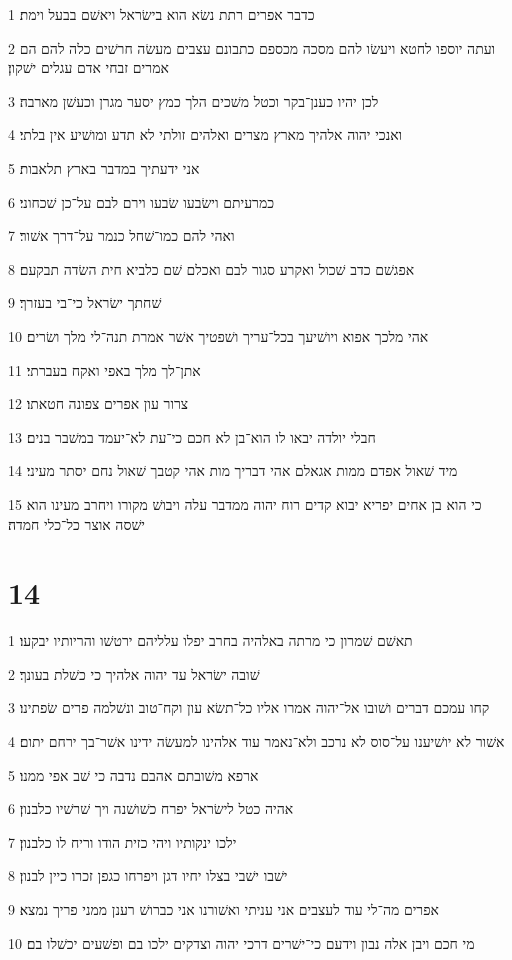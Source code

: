 \par 1 כדבר אפרים רתת נשׂא הוא בישׂראל ויאשׁם בבעל וימת׃
\par 2 ועתה יוספו לחטא ויעשׂו להם מסכה מכספם כתבונם עצבים מעשׂה חרשׁים כלה להם הם אמרים זבחי אדם עגלים ישׁקון׃
\par 3 לכן יהיו כענן־בקר וכטל משׁכים הלך כמץ יסער מגרן וכעשׁן מארבה׃
\par 4 ואנכי יהוה אלהיך מארץ מצרים ואלהים זולתי לא תדע ומושׁיע אין בלתי׃
\par 5 אני ידעתיך במדבר בארץ תלאבות׃
\par 6 כמרעיתם וישׂבעו שׂבעו וירם לבם על־כן שׁכחוני׃
\par 7 ואהי להם כמו־שׁחל כנמר על־דרך אשׁור׃
\par 8 אפגשׁם כדב שׁכול ואקרע סגור לבם ואכלם שׁם כלביא חית השׂדה תבקעם׃
\par 9 שׁחתך ישׂראל כי־בי בעזרך׃
\par 10 אהי מלכך אפוא ויושׁיעך בכל־עריך ושׁפטיך אשׁר אמרת תנה־לי מלך ושׂרים׃
\par 11 אתן־לך מלך באפי ואקח בעברתי׃
\par 12 צרור עון אפרים צפונה חטאתו׃
\par 13 חבלי יולדה יבאו לו הוא־בן לא חכם כי־עת לא־יעמד במשׁבר בנים׃
\par 14 מיד שׁאול אפדם ממות אגאלם אהי דבריך מות אהי קטבך שׁאול נחם יסתר מעיני׃
\par 15 כי הוא בן אחים יפריא יבוא קדים רוח יהוה ממדבר עלה ויבושׁ מקורו ויחרב מעינו הוא ישׁסה אוצר כל־כלי חמדה׃

\chapter{14}

\par 1 תאשׁם שׁמרון כי מרתה באלהיה בחרב יפלו עלליהם ירטשׁו והריותיו יבקעו׃
\par 2 שׁובה ישׂראל עד יהוה אלהיך כי כשׁלת בעונך׃
\par 3 קחו עמכם דברים ושׁובו אל־יהוה אמרו אליו כל־תשׂא עון וקח־טוב ונשׁלמה פרים שׂפתינו׃
\par 4 אשׁור לא יושׁיענו על־סוס לא נרכב ולא־נאמר עוד אלהינו למעשׂה ידינו אשׁר־בך ירחם יתום׃
\par 5 ארפא משׁובתם אהבם נדבה כי שׁב אפי ממנו׃
\par 6 אהיה כטל לישׂראל יפרח כשׁושׁנה ויך שׁרשׁיו כלבנון׃
\par 7 ילכו ינקותיו ויהי כזית הודו וריח לו כלבנון׃
\par 8 ישׁבו ישׁבי בצלו יחיו דגן ויפרחו כגפן זכרו כיין לבנון׃
\par 9 אפרים מה־לי עוד לעצבים אני עניתי ואשׁורנו אני כברושׁ רענן ממני פריך נמצא׃
\par 10 מי חכם ויבן אלה נבון וידעם כי־ישׁרים דרכי יהוה וצדקים ילכו בם ופשׁעים יכשׁלו בם׃


